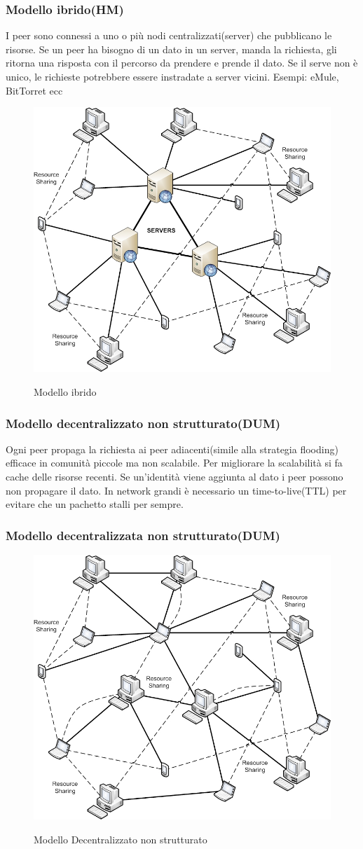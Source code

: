 \subsubsection{Modello ibrido(HM)}
I peer sono connessi a uno o più nodi centralizzati(server) che pubblicano le risorse.
Se un peer ha bisogno di un dato in un server, manda la richiesta, gli ritorna una risposta con il percorso da prendere e prende il dato.
Se il serve non è unico, le richieste potrebbere essere instradate a server vicini.
Esempi: eMule, BitTorret ecc
\begin{figure}[h!]
    \centering
    \includegraphics[width=0.5\linewidth]{imgs/8 - HM.png}
    \label{fig:p2pHM}
    \caption{Modello ibrido}
\end{figure}
\subsubsection{Modello decentralizzato non strutturato(DUM)}
Ogni peer propaga la richiesta ai peer adiacenti(simile alla strategia flooding) efficace in comunità piccole ma non scalabile.
Per migliorare la scalabilità si fa cache delle risorse recenti.
Se un'identità viene aggiunta al dato i peer possono non propagare il dato.
In network grandi è necessario un time-to-live(TTL) per evitare che un pachetto stalli per sempre.
\subsubsection{Modello decentralizzata non strutturato(DUM)}
\begin{figure}[h!]
    \centering
    \includegraphics[width=0.5\linewidth]{imgs/9 - DUM.png}
    \label{fig:p2pDUM}
    \caption{Modello Decentralizzato non strutturato}
\end{figure}
